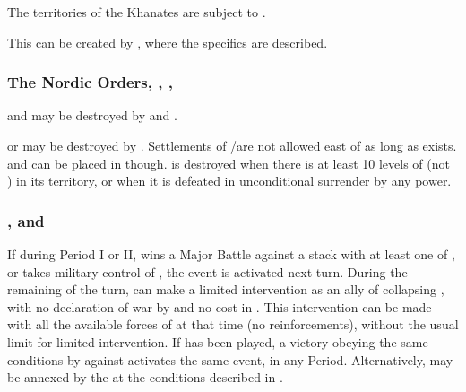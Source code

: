  The territories of the Khanates
are subject to .

 This \MIN can be created by
, where the specifics are described.

\subsubsection{The Nordic Orders, , , }
 \hfill {} 
\bparag {} and  may be destroyed by
 and .

 \hfill {} 
\bparag {} or  may be destroyed by
.
\label{chSpecific:Siberia} \hfill
{}
\bparag Settlements of \TP/\COL are not allowed east of
 as long as  exists. \TP and \COL
can be placed in  though.
\bparag {} is destroyed when there is at least 10 levels of
\COL (not \TP) in its territory, or when it is defeated in unconditional
surrender by any power.

\subsubsection{, 
  and }\label{chSpecific:Hungary}
  
 \hfill {}
\bparag If during Period I or II, \TUR wins a Major Battle against a
stack with at least one \ARMY of , or takes military
control of , the event  is
activated next turn.
\bparag During the remaining of the turn, \HAB can make a limited
intervention as an ally of collapsing , with no
declaration of war by \HAB and no cost in \STAB. This intervention can
be made with all the available forces of \HAB at that time (no
reinforcements), without the usual limit for limited intervention.
\bparag If  has been played, a victory
obeying the same conditions by \HAB against  activates the
same event, in any Period.
\bparag Alternatively,  may be annexed by the \hab at the
conditions described in .

